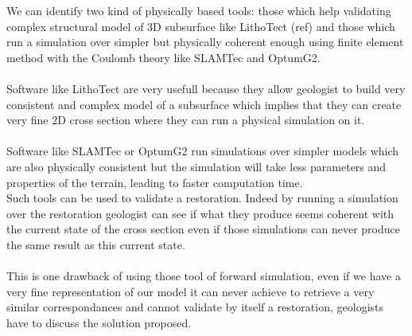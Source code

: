 \documentclass[12pt, a4paper]{memoir} %
\begin{document}
 We can identify two kind of physically based tools: those which help validating complex structural model of 3D subsurface like LithoTect (ref) and those which run a simulation over simpler but physically coherent enough using finite element method with the Coulomb theory like SLAMTec and OptumG2.\\\\
 
Software like LithoTect are very usefull because they allow geologist to build very consistent and complex model of a subsurface which implies that they can create very fine 2D cross section where they can run a physical simulation on it.\\\\

Software like SLAMTec or OptumG2 run simulations over simpler models which are also physically consistent but the simulation will take less parameters and properties of the terrain, leading to faster computation time.\\
Such tools can be used to validate a restoration. Indeed by running a simulation over the restoration geologist can see if what they produce seems coherent with the current state of the cross section even if those simulations can never produce the same result as this current state.\\\\

 This is one drawback of using those tool of forward simulation, even if we have a very fine representation of our model it can never achieve to retrieve a very similar correspondances and cannot validate by itself a restoration, geologists have to discuss the solution proposed.\\\\
 
\end{document}
